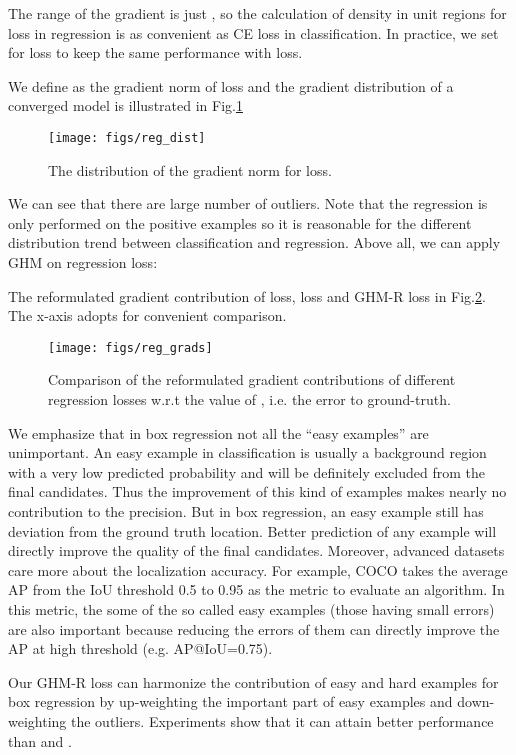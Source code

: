 \documentclass[letterpaper]{article} \usepackage{aaai19}  \usepackage{times}  \usepackage{helvet}  \usepackage{courier}  \usepackage{url}  \usepackage{graphicx}  \usepackage{amsmath,amssymb}
\begin{document}
The range of the gradient is just , so the calculation of density in unit regions for  loss in regression is as convenient as CE loss in classification. In practice, we set  for  loss to keep the same performance with  loss.

We define  as the gradient norm of  loss and the gradient distribution of a converged model is illustrated in Fig.\ref{fig:reg_dist}
\begin{figure}[ht]
\centering
\texttt{[image: figs/reg\_dist]}
\caption{The distribution of the gradient norm  for  loss.}
\label{fig:reg_dist}
\end{figure}
We can see that there are large number of outliers. Note that the regression is only performed on the positive examples so it is reasonable for the different distribution trend between classification and regression. Above all, we can apply  GHM on regression loss:


The reformulated gradient contribution of  loss,  loss and GHM-R loss in Fig.\ref{fig:reg_grads}. The x-axis adopts  for convenient comparison.
\begin{figure}[ht]
\centering
\texttt{[image: figs/reg\_grads]}
\caption{Comparison of the reformulated gradient contributions of different regression losses w.r.t the value of , i.e. the error to ground-truth.}
\label{fig:reg_grads}
\end{figure}

We emphasize that in box regression not all the ``easy examples'' are unimportant. An easy example in classification is usually a background region with a very low predicted probability and will be definitely excluded from the final candidates. Thus the improvement of this kind of examples makes nearly no contribution to the precision. But in box regression, an easy example still has deviation from the ground truth location. Better prediction of any example will directly improve the quality of the final candidates. 
Moreover, advanced datasets care more about the localization accuracy. For example, COCO \cite{coco} takes the average AP from the IoU threshold 0.5 to 0.95 as the metric to evaluate an algorithm. In this metric, the some of the so called easy examples (those having small errors) are also important because reducing the errors of them can directly improve the AP at high threshold (e.g. AP@IoU=0.75). 

Our GHM-R loss can harmonize the contribution of easy and hard examples for box regression by up-weighting the important part of easy examples and down-weighting the outliers.
Experiments show that it can attain better performance than  and .
\end{document}
